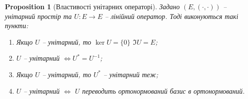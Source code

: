 \documentclass[a4paper, 10pt]{article}
\theoremstyle{theoremdd}
\newtheorem{proposition}[theorem]{Proposition}
\begin{document}
\begin{proposition}[Властивості унітарних операторі]
Задано $(E,(\cdot,\cdot))$ -- унітарний простір та $U \colon E \to E$ -- лінійний оператор. Тоді виконуються такі пункти:
\begin{enumerate}[nosep,wide=0pt,label={\arabic*)}]
\item Якщо $U$ -- унітарний, то $\ker U = \{0\}$ \qquad $\Im U = E$;
\item $U$ -- унітарний $\iff U^* = U^{-1}$;
\item Якщо $U$ -- унітарний, то $U^*$ -- унітарний теж;
\item $U$ -- унітарний $\iff$ $U$ переводить ортонормований базис в ортонормований.
\end{enumerate}
\end{proposition}
\end{document}
